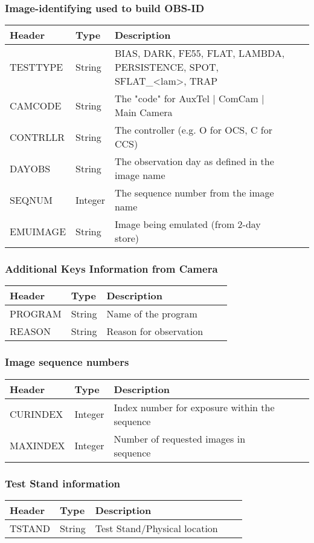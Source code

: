 \subsubsection{Image-identifying used to build OBS-ID}
\begin{tabular}{l l l l l}

\hline
Header & Type & Description \\
\hline
TESTTYPE & String & BIAS, DARK, FE55, FLAT, LAMBDA, PERSISTENCE, SPOT, SFLAT\_<lam>, TRAP \\
CAMCODE & String & The "code" for AuxTel | ComCam | Main Camera \\
CONTRLLR & String & The controller (e.g. O for OCS, C for CCS) \\
DAYOBS & String & The observation day as defined in the image name  \\
SEQNUM & Integer & The sequence number from the image name \\
EMUIMAGE & String & Image being emulated (from 2-day store) \\
\hline
\end{tabular}


\subsubsection{Additional Keys Information from Camera}
\begin{tabular}{l l l l l}

\hline
Header & Type & Description \\
\hline
PROGRAM & String & Name of the program \\
REASON & String & Reason for observation \\
\hline
\end{tabular}


\subsubsection{Image sequence numbers}
\begin{tabular}{l l l l l}

\hline
Header & Type & Description \\
\hline
CURINDEX & Integer & Index number for exposure within the sequence \\
MAXINDEX & Integer & Number of requested images in sequence \\
\hline
\end{tabular}


\subsubsection{Test Stand information}
\begin{tabular}{l l l l l}

\hline
Header & Type & Description \\
\hline
TSTAND & String & Test Stand/Physical location \\
\hline
\end{tabular}


